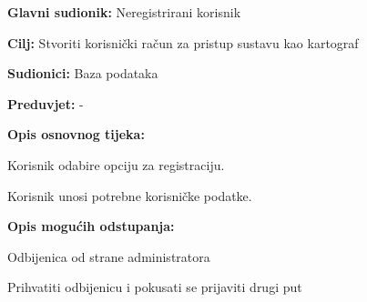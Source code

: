 				\begin{packed_item}
					
					\item \textbf{Glavni sudionik: }Neregistrirani korisnik
					\item  \textbf{Cilj:} Stvoriti korisnički račun za pristup sustavu kao kartograf
					\item  \textbf{Sudionici:} Baza podataka
					\item  \textbf{Preduvjet:} -
					\item  \textbf{Opis osnovnog tijeka:}
					
					\item[] \begin{packed_enum}
						
						\item Korisnik odabire opciju za registraciju.
						\item Korisnik unosi potrebne korisničke podatke.
					\end{packed_enum}
					
					\item  \textbf{Opis mogućih odstupanja:}
					
					\item[] \begin{packed_item}
						
						\item[2.a] Odbijenica od strane administratora
						\item[] \begin{packed_enum}
							
							\item Prihvatiti odbijenicu i pokusati se prijaviti drugi put
							
						\end{packed_enum}
						
					\end{packed_item}
				\end{packed_item}
				\noindent {}

